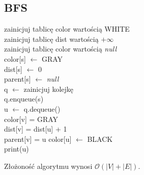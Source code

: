 \documentclass[12pt]{article}
\begin{document}
\subsection{BFS}
\begin{algorithm}[H]
\Begin
{
	zainicjuj tablicę color wartością WHITE\\
	zainicjuj tablicę dist wartością $+\infty$\\
	zainicjuj tablicę color wartością \emph{null}\\
	color[s] $\leftarrow$ GRAY\\
	dist[s] $\leftarrow$ 0\\
	parent[s] $\leftarrow$ \emph{null} \\
	q $\leftarrow$ zainicjuj kolejkę \\
	q.enqueue(s) \\
	{
		u $\leftarrow$ q.dequeue() \\
		{
			{
				color[v] = GRAY\\
				dist[v] = dist[u] + 1 \\
				parent[v] = u
			}
		}
		color[u] $\leftarrow$ BLACK\\
		print(u)
	}
}
\caption{BFS\textunderscore matrix}
\end{algorithm}	

Złożoność algorytmu wynosi $\mathcal{O}(|V| + |E|)$.
\end{document}
